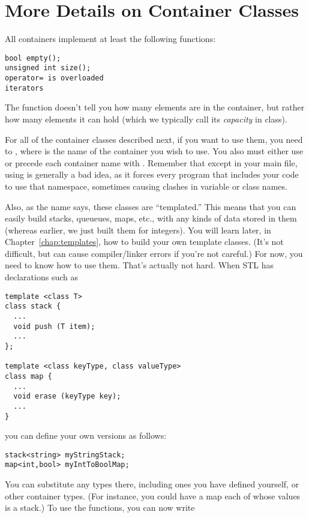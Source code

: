\section{More Details on Container Classes}

All containers implement at least the following functions:
\begin{verbatim}
bool empty();
unsigned int size();
operator= is overloaded
iterators
\end{verbatim}
	
The  function doesn't tell you how many elements are in
the container, but rather how many elements it can hold (which we
typically call its \emph{capacity} in class). 
	
For all of the container classes described next, if you want to use
them, you need to , where
 is the name of the container you wish to use.
You also must either use  or precede each
container name with . Remember that except in your main
file, using  is generally a bad idea, as it forces
every program that includes your code to use that namespace, sometimes
causing clashes in variable or class names.
	
Also, as the name says, these classes are ``templated.'' 
This means that you can easily build stacks, queueues, maps, etc., with
any kinds of data stored in them (whereas earlier, we just built them
for integers). You will learn later, in Chapter~\ref{chap:templates},
how to build your own template classes. (It's not difficult, but can
cause compiler/linker errors if you're not careful.) For now, you need
to know how to use them. That's actually not hard. 
When STL has declarations such as

\begin{verbatim}
template <class T>
class stack { 
  ...
  void push (T item);
  ...
};

template <class keyType, class valueType>
class map { 
  ...
  void erase (keyType key);
  ...
}
\end{verbatim}

you can define your own versions as follows:
\begin{verbatim}
stack<string> myStringStack;
map<int,bool> myIntToBoolMap;
\end{verbatim}

You can substitute any types there, including ones you have defined
yourself, or other container types. (For instance, you could have a
map each of whose values is a stack.) To use the functions, you can
now write

